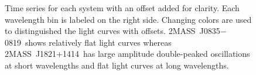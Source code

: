 \documentclass[twocolumn]{aastex6}
\newcommand{\sha}{2MASS~J0835$-$0819}
\newcommand{\shb}{2MASS~J1821+1414}
\begin{document}

\begin{figure}[!t]
\centering
{}
	\caption{Time series for each system with an offset added for clarity.
	Each wavelength bin is labeled on the right side. Changing colors are used to distinguished the light curves with offsets. \sha\ shows relatively flat light curves whereas \shb\ has large amplitude double-peaked oscillations at short wavelengths and flat light curves at long wavelengths.}
	\label{fig:tserDetrend}
\end{figure} 
\end{document}
